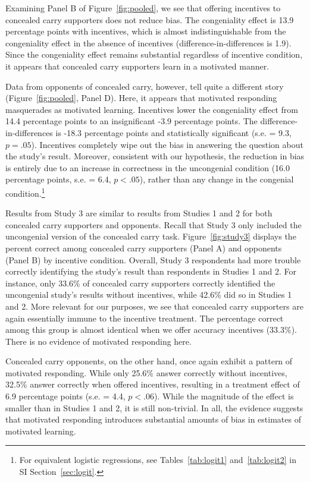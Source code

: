 \documentclass[12pt, letterpaper]{article}
\begin{document}
Examining Panel B of Figure~\ref{fig:pooled}, we see that offering incentives to concealed carry supporters does not reduce bias. The congeniality effect is 13.9 percentage points with incentives, which is almost indistinguishable from the congeniality effect in the absence of incentives (difference-in-differences is 1.9). Since the congeniality effect remains substantial regardless of incentive condition, it appears that concealed carry supporters learn in a motivated manner.

Data from opponents of concealed carry, however, tell quite a different story (Figure~\ref{fig:pooled}, Panel D). Here, it appears that motivated responding masquerades as motivated learning. Incentives lower the congeniality effect from 14.4 percentage points to an insignificant -3.9 percentage points. The difference-in-differences is -18.3 percentage points and statistically significant (s.e. = 9.3, $p = .05$). Incentives completely wipe out the bias in answering the question about the study's result. Moreover, consistent with our hypothesis, the reduction in bias is entirely due to an increase in correctness in the uncongenial condition (16.0 percentage points, s.e. = 6.4, $p < .05$), rather than any change in the congenial condition.\footnote{For equivalent logistic regressions, see Tables~\ref{tab:logit1} and~\ref{tab:logit2} in SI Section~\ref{sec:logit}.}

Results from Study 3 are similar to results from Studies 1 and 2 for both concealed carry supporters and opponents. Recall that Study 3 only included the uncongenial version of the concealed carry task. Figure~\ref{fig:study3} displays the percent correct among concealed carry supporters (Panel A) and opponents (Panel B) by incentive condition. Overall, Study 3 respondents had more trouble correctly identifying the study's result than respondents in Studies 1 and 2. For instance, only 33.6\% of concealed carry supporters correctly identified the uncongenial study's results without incentives, while 42.6\% did so in Studies 1 and 2. More relevant for our purposes, we see that concealed carry supporters are again essentially immune to the incentive treatment. The percentage correct among this group is almost identical when we offer accuracy incentives (33.3\%). There is no evidence of motivated responding here.

Concealed carry opponents, on the other hand, once again exhibit a pattern of motivated responding. While only 25.6\% answer correctly without incentives, 32.5\% answer correctly when offered incentives, resulting in a treatment effect of 6.9 percentage points  (s.e. = 4.4, $p < .06$). While the magnitude of the effect is smaller than in Studies 1 and 2, it is still non-trivial. In all, the evidence suggests that motivated responding introduces substantial amounts of bias in estimates of motivated learning.
\end{document}

